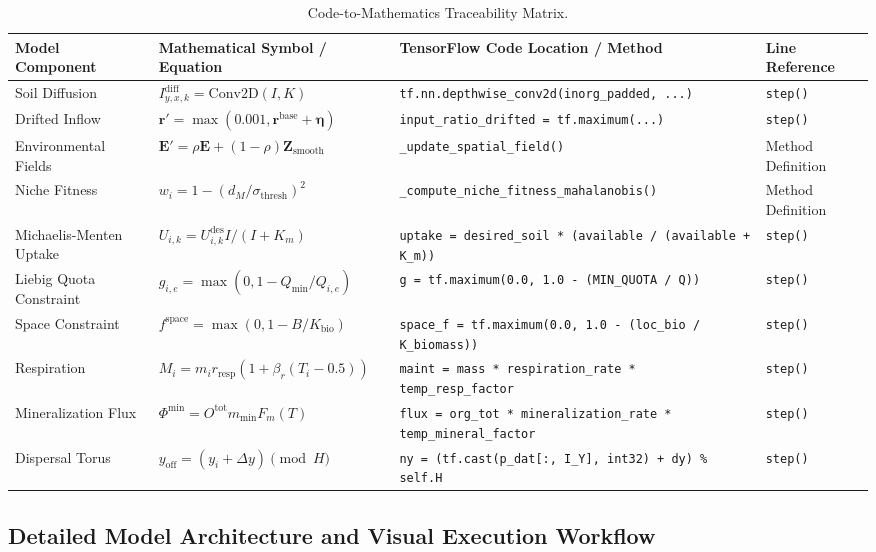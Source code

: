 \documentclass[11pt,a4paper]{article}
\begin{document}
\begin{longtable}{lp{4.5cm}p{5.5cm}l}
\caption{Code-to-Mathematics Traceability Matrix.} \label{tab:traceability} \\
\toprule
\textbf{Model Component} & \textbf{Mathematical Symbol / Equation} & \textbf{TensorFlow Code Location / Method} & \textbf{Line Reference} \\
\midrule
\endhead
Soil Diffusion & $I^{\text{diff}}_{y,x,k} = \text{Conv2D}(I, K)$ & \texttt{tf.nn.depthwise\_conv2d(inorg\_padded, ...)} & \texttt{step()} \\
Drifted Inflow & $\boldsymbol{r}' = \max(0.001, \boldsymbol{r}^{\text{base}} + \boldsymbol{\eta})$ & \texttt{input\_ratio\_drifted = tf.maximum(...)} & \texttt{step()} \\
Environmental Fields & $\mathbf{E}' = \rho \mathbf{E} + (1-\rho) \mathbf{Z}_{\text{smooth}}$ & \texttt{\_update\_spatial\_field()} & Method Definition \\
Niche Fitness & $w_i = 1 - (d_M / \sigma_{\text{thresh}})^2$ & \texttt{\_compute\_niche\_fitness\_mahalanobis()} & Method Definition \\
Michaelis-Menten Uptake & $U_{i,k} = U^{\text{des}}_{i,k} I / (I + K_m)$ & \texttt{uptake = desired\_soil * (available / (available + K\_m))} & \texttt{step()} \\
Liebig Quota Constraint & $g_{i,e} = \max(0, 1 - Q_{\min}/Q_{i,e})$ & \texttt{g = tf.maximum(0.0, 1.0 - (MIN\_QUOTA / Q))} & \texttt{step()} \\
Space Constraint & $f^{\text{space}} = \max(0, 1 - B / K_{\text{bio}})$ & \texttt{space\_f = tf.maximum(0.0, 1.0 - (loc\_bio / K\_biomass))} & \texttt{step()} \\
Respiration & $M_i = m_i r_{\text{resp}} (1 + \beta_r (T_i - 0.5))$ & \texttt{maint = mass * respiration\_rate * temp\_resp\_factor} & \texttt{step()} \\
Mineralization Flux & $\Phi^{\text{min}} = O^{\text{tot}} m_{\text{min}} F_m(T)$ & \texttt{flux = org\_tot * mineralization\_rate * temp\_mineral\_factor} & \texttt{step()} \\
Dispersal Torus & $y_{\text{off}} = (y_i + \Delta y) \pmod H$ & \texttt{ny = (tf.cast(p\_dat[:, I\_Y], int32) + dy) \% self.H} & \texttt{step()} \\
\bottomrule
\end{longtable}

\subsection{Detailed Model Architecture and Visual Execution Workflow}
\end{document}
